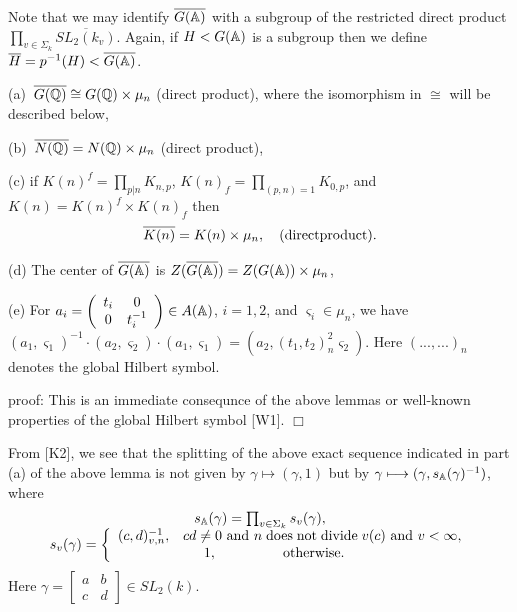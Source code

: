 Note that we may identify $\overline{G({\Bbb{A}})}$ with a subgroup of the
restricted direct product
$\prod_{v\in \Sigma _k}\overline{SL_2(k_v)}$. Again,
if $H<G({\Bbb{A}})$ is a subgroup then we define
$\overline{H}=p^{-1}(H)<\overline{G({\Bbb{A}})}$.

\begin{lemma}
(a)\ $\overline{G({\Bbb{Q}})}\cong G({\Bbb{Q}})\times \mu _n$
(direct product), where the isomorphism in $\cong$ will be
described below,

(b)\ $\overline{N({\Bbb{Q}})}=N({\Bbb{Q}})\times \mu _n$ (direct product),

(c) if $K(n)^f=\prod_{p|n}K_{n,p}$, $K(n)_f=\prod_{(p,n)=1}K_{0,p}$, and
$K(n)=K(n)^f\times K(n)_f$ then 
\[
\overline{K(n)}=K(n)\times \mu _n,
\ \ \ {\rm (direct product)}.
\]

(d) The center of $\overline{G({\Bbb{A}})}$ is
$Z(\overline{G({\Bbb{A}})})=Z(G({{\Bbb{A}}}))\times \mu _n$,

(e) For $a_i=\left( 
\begin{array}{cc}
t_i & 0 \\ 
0 & t_i^{-1}
\end{array}
\right) \in A({\Bbb{A}})$, $i=1,2$, and $\varsigma _i\in \mu _n$, we have $%
(a_1,\varsigma _1)^{-1}\cdot (a_2,\varsigma _2)\cdot (a_1,\varsigma
_1)=(a_2,(t_1,t_2)_n^2\varsigma _2)$. Here $(...,...)_n$ denotes the global
Hilbert symbol.
\end{lemma}

proof: This is an immediate consequnce of the above lemmas or well-known
properties of the global Hilbert symbol [W1]. $\Box $

From [K2], we see that
the splitting of the above exact sequence indicated in part (a) of the above
lemma is not given by $\gamma \longmapsto (\gamma ,1)$ but by $\gamma
\longmapsto (\gamma ,s_{{\Bbb{A}}}(\gamma )^{-1})$, where 
\begin{equation}
\begin{array}{c}
s_{{\Bbb{A}}}(\gamma )=
\prod_{v\in \Sigma _k}
s_v(\gamma),\\
s_v(\gamma)=\left\{ 
\begin{array}{c}
(c,d)_{v,n}^{-1},
\;\;\;cd\neq 0{\rm \ and\ }
n\;\mathrm{does\;not\;divide}\;v(c)
{\rm \ and\ }v<\infty, \\ 
1,\;\;\;\;\;\;\;\;\;\;\;\;\;\;\;\;
\mathrm{\;otherwise}.\;\;\;\;\;\;\;\;
\end{array}
\right.
\end{array}
\end{equation}
Here $\gamma =\left[ 
\begin{array}{cc}
a & b \\ 
c & d
\end{array}
\right] \in SL_2(k)$.

